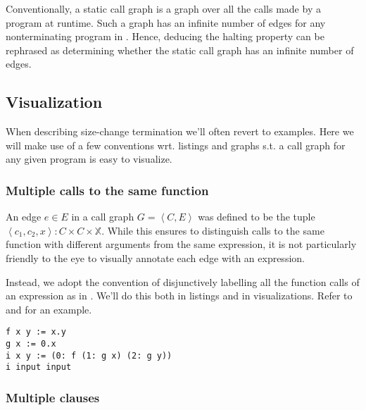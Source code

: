Conventionally, a static call graph is a graph over all the calls made by a
program at runtime. Such a graph has an infinite number of edges for any
nonterminating program in \D{}. Hence, deducing the halting property can be
rephrased as determining whether the static call graph has an infinite number
of edges.

\subsection{Visualization}

When describing size-change termination we'll often revert to examples. Here we
will make use of a few conventions wrt. listings and graphs s.t. a call graph
for any given program is easy to visualize.

\subsubsection{Multiple calls to the same function}

An edge $e\in E$ in a call graph $G = \left\langle C,E \right\rangle$ was
defined to be the tuple $\left\langle c_1, c_2, x \right\rangle : C \times C
\times \mathbb{X}$. While this ensures to distinguish calls to the same
function with different arguments from the same expression, it is not
particularly friendly to the eye to visually annotate each edge with an
expression.

Instead, we adopt the convention of disjunctively labelling all the function
calls of an expression as in \cite{size-change}. We'll do this both in listings
and in visualizations. Refer to  and
 for an example.

\begin{lstlisting}[label=listing:cfg-sample-2,
  caption={A sample \D{} program, always returning \mono{(0.x).(0.y)},
  where \mono{x} and \mono{y} are arbitrary \D{} values supplied by the user.}]
f x y := x.y
g x := 0.x
i x y := (0: f (1: g x) (2: g y))
i input input
\end{lstlisting}


\subsubsection{Multiple clauses}

